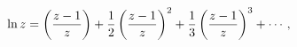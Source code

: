 \[\mathop{\ln\/}\nolimits z=\left(\frac{z-1}{z}\right)+\frac{1}{2}\left(\frac{z-%
1}{z}\right)^{2}+\frac{1}{3}\left(\frac{z-1}{z}\right)^{3}+\cdots,\]